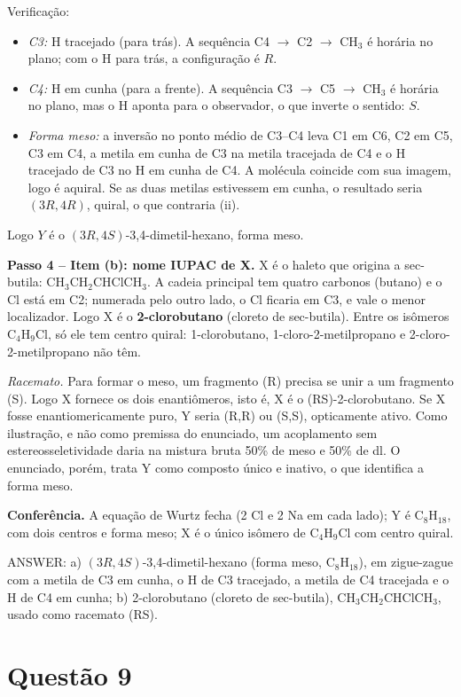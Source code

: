 \documentclass{article}%
\begin{document}
Verificação:
\begin{itemize}
\item \emph{C3:} H tracejado (para trás). A sequência C4 $\to$ C2 $\to$ CH$_3$ é horária no plano; com o H para trás, a configuração é $R$.
\item \emph{C4:} H em cunha (para a frente). A sequência C3 $\to$ C5 $\to$ CH$_3$ é horária no plano, mas o H aponta para o observador, o que inverte o sentido: $S$.
\item \emph{Forma meso:} a inversão no ponto médio de C3--C4 leva C1 em C6, C2 em C5, C3 em C4, a metila em cunha de C3 na metila tracejada de C4 e o H tracejado de C3 no H em cunha de C4. A molécula coincide com sua imagem, logo é aquiral. Se as duas metilas estivessem em cunha, o resultado seria $(3R,4R)$, quiral, o que contraria (ii).
\end{itemize}

Logo $Y$ é o $(3R,4S)$-3,4-dimetil-hexano, forma meso.

\textbf{Passo 4 -- Item (b): nome IUPAC de X.} X é o haleto que origina a sec-butila: $\mathrm{CH_3CH_2CHClCH_3}$. A cadeia principal tem quatro carbonos (butano) e o Cl está em C2; numerada pelo outro lado, o Cl ficaria em C3, e vale o menor localizador. Logo X é o \textbf{2-clorobutano} (cloreto de sec-butila). Entre os isômeros $\mathrm{C_4H_9Cl}$, só ele tem centro quiral: 1-clorobutano, 1-cloro-2-metilpropano e 2-cloro-2-metilpropano não têm.

\emph{Racemato.} Para formar o meso, um fragmento (R) precisa se unir a um fragmento (S). Logo X fornece os dois enantiômeros, isto é, X é o (RS)-2-clorobutano. Se X fosse enantiomericamente puro, Y seria (R,R) ou (S,S), opticamente ativo. Como ilustração, e não como premissa do enunciado, um acoplamento sem estereosseletividade daria na mistura bruta 50\% de meso e 50\% de dl. O enunciado, porém, trata Y como composto único e inativo, o que identifica a forma meso.

\textbf{Conferência.} A equação de Wurtz fecha (2 Cl e 2 Na em cada lado); Y é C$_8$H$_{18}$, com dois centros e forma meso; X é o único isômero de C$_4$H$_9$Cl com centro quiral.

ANSWER: a) $(3R,4S)$-3,4-dimetil-hexano (forma meso, $\mathrm{C_8H_{18}}$), em zigue-zague com a metila de C3 em cunha, o H de C3 tracejado, a metila de C4 tracejada e o H de C4 em cunha; b) 2-clorobutano (cloreto de sec-butila), $\mathrm{CH_3CH_2CHClCH_3}$, usado como racemato (RS).%
\newpage%
\section*{Questão 9}
\end{document}
